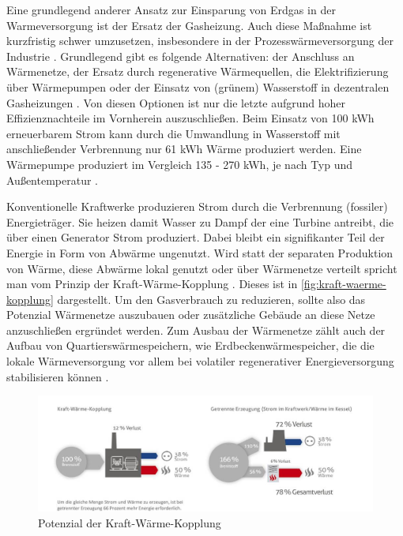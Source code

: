 Eine grundlegend anderer Ansatz zur Einsparung von Erdgas in der Warmeversorgung ist der Ersatz der Gasheizung. Auch diese Maßnahme ist kurzfristig schwer umzusetzen, insbesondere in der Prozesswärmeversorgung der Industrie \cite{leo}. Grundlegend gibt es folgende Alternativen: der Anschluss an Wärmenetze, der Ersatz durch regenerative Wärmequellen, die Elektrifizierung über Wärmepumpen oder der Einsatz von (grünem) Wasserstoff in dezentralen Gasheizungen \cite{clausen2022}.
Von diesen Optionen ist nur die letzte aufgrund hoher Effizienznachteile im Vornherein auszuschließen. Beim Einsatz von 100 kWh erneuerbarem Strom kann durch die Umwandlung in Wasserstoff mit anschließender Verbrennung 
nur 61 kWh Wärme produziert werden. Eine Wärmepumpe produziert im Vergleich 135 - 270 kWh, je nach Typ und Außentemperatur \cite{agora-wasserstoff}.

Konventionelle Kraftwerke produzieren Strom durch die Verbrennung (fossiler) Energieträger. Sie heizen damit Wasser zu Dampf der eine Turbine antreibt, die über einen Generator Strom produziert. Dabei bleibt ein signifikanter Teil der Energie in Form von Abwärme ungenutzt. Wird statt der separaten Produktion von Wärme, diese Abwärme lokal genutzt oder über Wärmenetze verteilt spricht man vom Prinzip der Kraft-Wärme-Kopplung \cite{kwk}. Dieses ist in \autoref{fig:kraft-waerme-kopplung} dargestellt. 
Um den Gasverbrauch zu reduzieren, sollte also das Potenzial Wärmenetze auszubauen oder zusätzliche Gebäude an diese Netze anzuschließen ergründet werden.
Zum Ausbau der Wärmenetze zählt auch der Aufbau von Quartierswärmespeichern, wie Erdbeckenwärmespeicher, die die lokale Wärmeversorgung vor allem bei volatiler regenerativer Energieversorgung stabilisieren können \cite{clausen2022}.

\begin{figure}[h]
\centering
\includegraphics[width=14cm]{../fig/kraft-waerme-kopplung.jpg}
\caption{Potenzial der Kraft-Wärme-Kopplung \cite{kwk}}
\label{fig:kraft-waerme-kopplung}
\end{figure}

